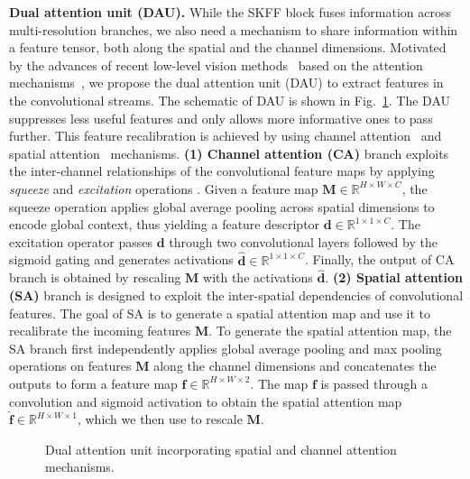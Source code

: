 \documentclass[runningheads]{llncs}
\begin{document}
\vspace{0.4em} \noindent \textbf{Dual attention unit (DAU).}
While the SKFF block fuses information across multi-resolution branches, we also need a mechanism to share information within a feature tensor, both along the spatial and the channel dimensions.
Motivated by the advances of recent low-level vision methods~\cite{RCAN,RIDNet,dai2019second,zhang2019residual} based on the attention mechanisms~\cite{hu2018squeeze,wang2018non},
we propose the dual attention unit (DAU) to extract features in the convolutional streams. The schematic of DAU is shown in Fig.~\ref{fig:dau}.
The DAU suppresses less useful features and only allows more informative ones to pass further. 
This feature recalibration is achieved by using channel attention~\cite{hu2018squeeze} and spatial attention~\cite{woo2018cbam} mechanisms. 
\textbf{(1) Channel attention (CA)} branch exploits the inter-channel relationships of the convolutional feature maps by applying \emph{squeeze} and \emph{excitation} operations \cite{hu2018squeeze}. Given a feature map $\mathbf{M} \in \mathbb{R}^{H\times W \times C}$, the squeeze operation applies global average pooling across spatial dimensions to encode global context, thus yielding a feature descriptor $\mathbf{d} \in \mathbb{R}^{1\times 1 \times C}$. 
The excitation operator passes $\mathbf{d}$ through two convolutional layers followed by the sigmoid gating and generates activations $\mathbf{\hat{d}} \in \mathbb{R}^{1\times 1 \times C}$. 
Finally, the output of CA branch is obtained by rescaling $\mathbf{M}$ with the activations $\mathbf{\hat{d}}$.
\textbf{(2) Spatial attention (SA)} branch is designed to exploit the inter-spatial dependencies of convolutional features. The goal of SA is to generate a spatial attention map and use it to recalibrate the incoming features $\mathbf{M}$. 
To generate the spatial attention map, the SA branch first independently applies global average pooling and max pooling operations on features $\mathbf{M}$ along the channel dimensions and concatenates the outputs to form a feature map $\mathbf{f} \in \mathbb{R}^{H\times W \times 2}$. The map $\mathbf{f}$ is passed through a convolution and sigmoid activation to obtain the spatial attention map $\mathbf{\hat{f}} \in \mathbb{R}^{H\times W \times 1}$, which we then use to rescale $\mathbf{M}$. 



\begin{figure}[t]
\begin{center}
\end{center}
\vspace*{-6mm}
\caption{\small Dual attention unit incorporating spatial and channel attention mechanisms. }
\label{fig:dau}
\vspace{-0.6em}
\end{figure}
\end{document}
